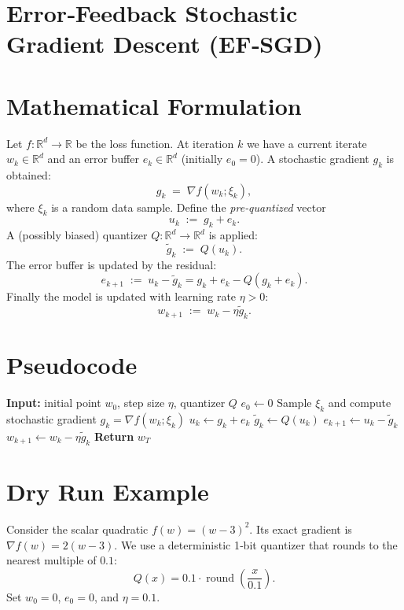 \documentclass{article}
\begin{document}
\section*{Error‑Feedback Stochastic Gradient Descent (EF‑SGD)}

\section*{Mathematical Formulation}
Let $f:\mathbb{R}^d\to\mathbb{R}$ be the loss function.  
At iteration $k$ we have a current iterate $w_k\in\mathbb{R}^d$ and an
error buffer $e_k\in\mathbb{R}^d$ (initially $e_0=0$).  
A stochastic gradient $g_k$ is obtained:
\[
g_k \;=\; \nabla f(w_k;\xi_k),
\]
where $\xi_k$ is a random data sample.  
Define the \emph{pre‑quantized} vector
\[
u_k \;:=\; g_k+e_k .
\]
A (possibly biased) quantizer $Q:\mathbb{R}^d\to\mathbb{R}^d$ is applied:
\[
\tilde g_k \;:=\; Q(u_k).
\]
The error buffer is updated by the residual:
\[
e_{k+1}\;:=\; u_k-\tilde g_k = g_k+e_k-Q(g_k+e_k). \tag{1}
\]
Finally the model is updated with learning rate $\eta>0$:
\[
w_{k+1}\;:=\; w_k-\eta \tilde g_k . \tag{2}
\]

\section*{Pseudocode}
\begin{algorithm}[H]
\caption{EF‑SGD}
\begin{algorithmic}[1]
\State \textbf{Input:} initial point $w_0$, step size $\eta$, quantizer $Q$
\State $e_0\gets 0$
    \State Sample $\xi_k$ and compute stochastic gradient $g_k=\nabla f(w_k;\xi_k)$
    \State $u_k \gets g_k+e_k$
    \State $\tilde g_k \gets Q(u_k)$
    \State $e_{k+1}\gets u_k-\tilde g_k$ 
    \State $w_{k+1}\gets w_k-\eta \tilde g_k$ 
\EndFor
\State \textbf{Return} $w_T$
\end{algorithmic}
\end{algorithm}

\section*{Dry Run Example}
Consider the scalar quadratic $f(w)=(w-3)^2$.
Its exact gradient is $\nabla f(w)=2(w-3)$.  
We use a deterministic 1‑bit quantizer that rounds to the nearest
multiple of $0.1$:
\[
Q(x)=0.1\cdot\operatorname{round}\!\left(\frac{x}{0.1}\right).
\]
Set $w_0=0$, $e_0=0$, and $\eta=0.1$.
\end{document}
